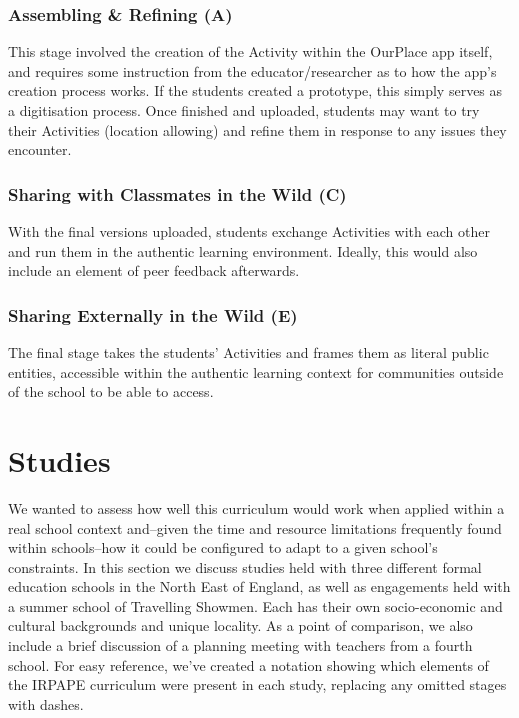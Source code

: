 \documentclass[,hyphens]{sigchi}
\begin{document}
\subsubsection{Assembling \& Refining (A)}

This stage involved the creation of the Activity within the OurPlace app itself, and requires some instruction from the educator/researcher as to how the app's creation process works. If the students created a prototype, this simply serves as a digitisation process. Once finished and uploaded, students may want to try their Activities (location allowing) and refine them in response to any issues they encounter.  

\subsubsection{Sharing with Classmates in the Wild (C)}

With the final versions uploaded, students exchange Activities with each other and run them in the authentic learning environment. Ideally, this would also include an element of peer feedback afterwards.

\subsubsection{Sharing Externally in the Wild (E)}

The final stage takes the students' Activities and frames them as literal public entities, accessible within the authentic learning context for communities outside of the school to be able to access.

\section{Studies}

We wanted to assess how well this curriculum would work when applied within a real school context and--given the time and resource limitations frequently found within schools--how it could be configured to adapt to a given school's constraints. In this section we discuss studies held with three different formal education schools in the North East of England, as well as engagements held with a summer school of Travelling Showmen. Each has their own socio-economic and cultural backgrounds and unique locality. As a point of comparison, we also include a brief discussion of a planning meeting with teachers from a fourth school. For easy reference, we've created a notation showing which elements of the IRPAPE curriculum were present in each study, replacing any omitted stages with dashes.
\end{document}
